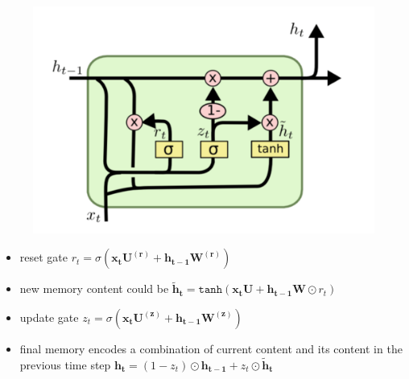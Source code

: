 \documentclass[12pt]{beamer}
\begin{document}
\begin{frame}
	\centering
	\begin{figure}
		\centering
		\includegraphics[scale=0.2]{./img/gru.png}
	\end{figure}
	\begin{itemize}
		\item reset gate $r_t = \sigma ( \bm{x_t} \bm{U^{(r)}} + \bm{h_{t-1}} \bm{W^{(r)}} )$
		\item new memory content could be $\bm{\tilde{h}_t} = \texttt{tanh} ( \bm{x_t} \bm{U} + \bm{h_{t-1}} \bm{W} 
		\odot r_t)$ 
		\item update gate $z_t = \sigma ( \bm{x_t} \bm{U^{(z)}} + \bm{h_{t-1}} \bm{W^{(z)}} )$
		\item final memory encodes a combination of current content and its content in the previous time step
		$\bm{h_t} = (1-z_t) \odot \bm{h_{t-1}} + z_t \odot \bm{\tilde{h}_t}$
	\end{itemize}
\end{frame}
\end{document}
